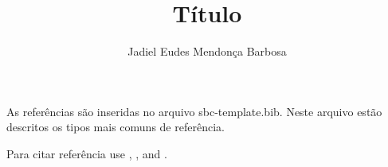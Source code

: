\documentclass[12pt]{article}
\title{Título}
\author{Jadiel Eudes Mendonça Barbosa \inst{1} }
\begin{document}
 

\maketitle















As referências são inseridas no arquivo  sbc-template.bib. Neste arquivo estão descritos os tipos mais comuns de referência.

Para citar referência use \cite{knuth:84}, \cite{boulic:91},  and \cite{smith:99}.



\end{document}
